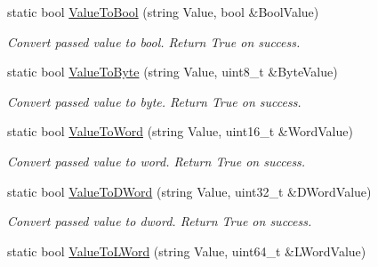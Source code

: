 \begin{DoxyCompactItemize}
\item 
static bool \hyperlink{classpc__emulator_1_1DataTypeUtils_a299a4f130ef9cd9529c9e2db79669f80}{Value\+To\+Bool} (string Value, bool \&Bool\+Value)\hypertarget{classpc__emulator_1_1DataTypeUtils_a299a4f130ef9cd9529c9e2db79669f80}{}\label{classpc__emulator_1_1DataTypeUtils_a299a4f130ef9cd9529c9e2db79669f80}

\begin{DoxyCompactList}\small\item\em Convert passed value to bool. Return True on success. \end{DoxyCompactList}\item 
static bool \hyperlink{classpc__emulator_1_1DataTypeUtils_a7f842d480fed9a96e3e3971565d1193e}{Value\+To\+Byte} (string Value, uint8\+\_\+t \&Byte\+Value)\hypertarget{classpc__emulator_1_1DataTypeUtils_a7f842d480fed9a96e3e3971565d1193e}{}\label{classpc__emulator_1_1DataTypeUtils_a7f842d480fed9a96e3e3971565d1193e}

\begin{DoxyCompactList}\small\item\em Convert passed value to byte. Return True on success. \end{DoxyCompactList}\item 
static bool \hyperlink{classpc__emulator_1_1DataTypeUtils_a150c8f2968f3d419708da44ffdada4b1}{Value\+To\+Word} (string Value, uint16\+\_\+t \&Word\+Value)\hypertarget{classpc__emulator_1_1DataTypeUtils_a150c8f2968f3d419708da44ffdada4b1}{}\label{classpc__emulator_1_1DataTypeUtils_a150c8f2968f3d419708da44ffdada4b1}

\begin{DoxyCompactList}\small\item\em Convert passed value to word. Return True on success. \end{DoxyCompactList}\item 
static bool \hyperlink{classpc__emulator_1_1DataTypeUtils_a5d51cb72a80928caa8f1b2c1f6dec580}{Value\+To\+D\+Word} (string Value, uint32\+\_\+t \&D\+Word\+Value)\hypertarget{classpc__emulator_1_1DataTypeUtils_a5d51cb72a80928caa8f1b2c1f6dec580}{}\label{classpc__emulator_1_1DataTypeUtils_a5d51cb72a80928caa8f1b2c1f6dec580}

\begin{DoxyCompactList}\small\item\em Convert passed value to dword. Return True on success. \end{DoxyCompactList}\item 
static bool \hyperlink{classpc__emulator_1_1DataTypeUtils_a1830130ad79852bcbbe2b20bd30bb21b}{Value\+To\+L\+Word} (string Value, uint64\+\_\+t \&L\+Word\+Value)\hypertarget{classpc__emulator_1_1DataTypeUtils_a1830130ad79852bcbbe2b20bd30bb21b}{}\label{classpc__emulator_1_1DataTypeUtils_a1830130ad79852bcbbe2b20bd30bb21b}


\end{DoxyCompactItemize}
